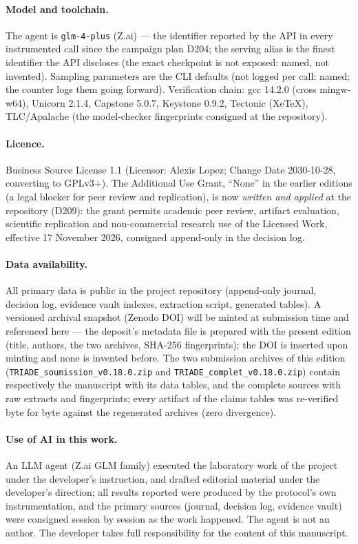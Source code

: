 \documentclass[11pt,a4paper]{article}
\newcommand{\code}[1]{\texttt{\small #1}}
\begin{document}
\paragraph{Model and toolchain.} The agent is \code{glm-4-plus}
(Z.ai) --- the identifier reported by the API in every instrumented
call since the campaign plan D204; the serving alias is the finest
identifier the API discloses (the exact checkpoint is not exposed:
named, not invented). Sampling parameters are the CLI defaults (not
logged per call: named; the counter logs them going forward).
Verification chain: gcc 14.2.0 (cross mingw-w64), Unicorn 2.1.4,
Capstone 5.0.7, Keystone 0.9.2, Tectonic (XeTeX), TLC/Apalache (the
model-checker fingerprints consigned at the repository).

\paragraph{Licence.} Business Source License 1.1 (Licensor: Alexis
Lopez; Change Date 2030-10-28, converting to GPLv3+). The Additional
Use Grant, ``None'' in the earlier editions (a legal blocker for peer
review and replication), is now \emph{written and applied} at the
repository (D209): the grant permits academic peer review, artifact
evaluation, scientific replication and non-commercial research use of
the Licensed Work, effective 17 November 2026, consigned append-only
in the decision log.

\paragraph{Data availability.} All primary data is public in the project
repository (append-only journal, decision log, evidence vault indexes,
extraction script, generated tables). A versioned archival snapshot
(Zenodo DOI) will be minted at submission time and referenced here ---
the deposit's metadata file is prepared with the present edition
(title, authors, the two archives, SHA-256 fingerprints); the DOI is
inserted upon minting and none is invented before. The
two submission archives of this edition (\code{TRIADE\_soumission\_v0.18.0.zip}
and \code{TRIADE\_complet\_v0.18.0.zip}) contain respectively the
manuscript with its data tables, and the complete sources with raw
extracts and fingerprints; every artifact of the claims tables was
re-verified byte for byte against the regenerated archives (zero
divergence).

\paragraph{Use of AI in this work.} An LLM agent (Z.ai GLM family)
executed the laboratory work of the project under the developer's
instruction, and drafted editorial material under the developer's
direction; all results reported were produced by the protocol's own
instrumentation, and the primary sources (journal, decision log,
evidence vault) were consigned session by session as the work happened.
The agent is not an author. The developer takes full responsibility for
the content of this manuscript.
\end{document}
